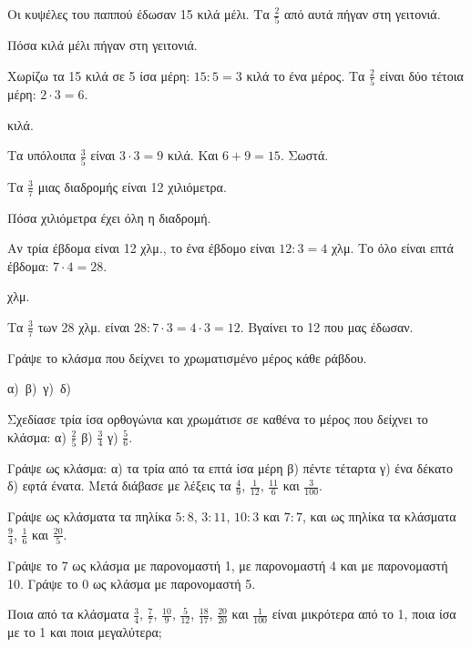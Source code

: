 \tixero Οι κυψέλες του παππού έδωσαν 15 κιλά μέλι. Τα $\frac{2}{5}$ από αυτά πήγαν στη γειτονιά.\par
\tithelo Πόσα κιλά μέλι πήγαν στη γειτονιά.\par
\possindeo Χωρίζω τα 15 κιλά σε 5 ίσα μέρη: $15:5=3$ κιλά το ένα μέρος. Τα $\frac{2}{5}$ είναι δύο τέτοια μέρη: $2\cdot 3=6$.\par
{} κιλά.\par
\elegxos Τα υπόλοιπα $\frac{3}{5}$ είναι $3\cdot 3=9$ κιλά. Και $6+9=15$. Σωστά.

\tixero Τα $\frac{3}{7}$ μιας διαδρομής είναι 12 χιλιόμετρα.\par
\tithelo Πόσα χιλιόμετρα έχει όλη η διαδρομή.\par
\possindeo Αν τρία έβδομα είναι 12 χλμ., το ένα έβδομο είναι $12:3=4$ χλμ. Το όλο είναι επτά έβδομα: $7\cdot 4=28$.\par
{} χλμ.\par
\elegxos Τα $\frac{3}{7}$ των 28 χλμ. είναι $28:7\cdot 3=4\cdot 3=12$. Βγαίνει το 12 που μας έδωσαν.



\ex Γράψε το κλάσμα που δείχνει το χρωματισμένο μέρος κάθε ράβδου.\par\smallskip
α)\ \quad β)\ \quad γ)\ \quad δ)\ 

\ex Σχεδίασε τρία ίσα ορθογώνια και χρωμάτισε σε καθένα το μέρος που δείχνει το κλάσμα: α) $\frac{2}{5}$ \quad β) $\frac{3}{4}$ \quad γ) $\frac{5}{6}$.

\ex Γράψε ως κλάσμα: α) τα τρία από τα επτά ίσα μέρη \quad β) πέντε τέταρτα \quad γ) ένα δέκατο \quad δ) εφτά ένατα. Μετά διάβασε με λέξεις τα $\frac{4}{9}$, $\frac{1}{12}$, $\frac{11}{6}$ και $\frac{3}{100}$.

\ex Γράψε ως κλάσματα τα πηλίκα $5:8$, $3:11$, $10:3$ και $7:7$, και ως πηλίκα τα κλάσματα $\frac{9}{4}$, $\frac{1}{6}$ και $\frac{20}{5}$.

\ex Γράψε το 7 ως κλάσμα με παρονομαστή 1, με παρονομαστή 4 και με παρονομαστή 10. Γράψε το 0 ως κλάσμα με παρονομαστή 5.

\ex Ποια από τα κλάσματα $\frac{3}{4}$, $\frac{7}{7}$, $\frac{10}{9}$, $\frac{5}{12}$, $\frac{18}{17}$, $\frac{20}{20}$ και $\frac{1}{100}$ είναι μικρότερα από το 1, ποια ίσα με το 1 και ποια μεγαλύτερα;

